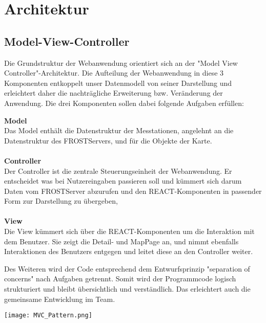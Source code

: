 \section{Architektur}

\subsection{Model-View-Controller}
Die Grundstruktur der Webanwendung orientiert sich an der "Model View Controller"-Architektur. Die Aufteilung der Webanwendung in diese 3 Komponenten entkoppelt unser Datenmodell von seiner Darstellung und erleichtert daher die nachträgliche Erweiterung bzw. Veränderung der Anwendung.
Die drei Komponenten sollen dabei folgende Aufgaben erfüllen:
\begin{addmargin}[25pt]{0pt}
    \textbf{Model}\\
    Das Model enthält die Datenstruktur der Messtationen, angelehnt an die Datenstruktur des FROSTServers, und für die Objekte der Karte.
    \\ \\
    \textbf{Controller}\\
    Der Controller ist die zentrale Steuerungseinheit der Webanwendung. Er entscheidet was bei Nutzereingaben passieren soll und kümmert sich darum Daten vom FROSTServer abzurufen und den REACT-Komponenten in passender Form zur Darstellung zu übergeben,
    \\ \\
    \textbf{View}\\
    Die View kümmert sich über die REACT-Komponenten um die Interaktion mit dem Benutzer. Sie zeigt die Detail- und MapPage an, und nimmt ebenfalls Interaktionen des Benutzers entgegen und leitet diese an den Controller weiter.
\end{addmargin}

Des Weiteren wird der Code entsprechend dem Entwurfsprinzip "separation of concerns" nach Aufgaben getrennt. Somit wird der Programmcode logisch strukturiert und bleibt übersichtlich und verständlich. Das erleichtert auch die gemeinsame Entwicklung im Team.

\vspace{5mm}

\texttt{[image: MVC\_Pattern.png]}

\newpage

